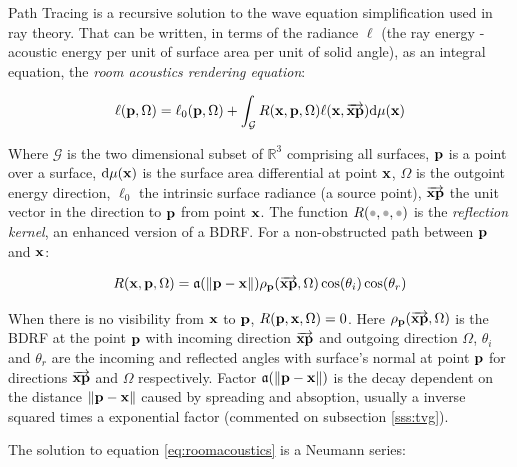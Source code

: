 Path Tracing is a recursive solution to the wave equation simplification used in
ray theory. That can be written, in terms of the radiance $\ell$ (the ray
energy - acoustic energy per unit of surface area per unit of solid angle), as an
integral equation, the \textit{room acoustics rendering
equation}\cite{siltanen2007room}:

\begin{equation}
\label{eq:roomacoustics}
\ell (\mathrm{\mathbf{p}},\Omega) = \ell_0(\mathrm{\mathbf{p}},\Omega) + \int_\mathcal{G}
R(\mathrm{\mathbf{x}},\mathrm{\mathbf{p}},\Omega) \ell
(\mathrm{\mathbf{x}},\overrightarrow{\mathrm{\mathbf{x}}\mathrm{\mathbf{p}}} ) \mathrm{d}\mu(\mathrm{\mathbf{x}})
\end{equation}

Where $\mathcal{G}$ is the two dimensional subset of $\mathbb{R}^3$ comprising
all surfaces, $\mathrm{\mathbf{p}}$ is a point over a surface, $\mathrm{d}\mu(\mathrm{\mathbf{x}})$ is the
surface area differential at point $\mathrm{\mathbf{x}}$, $\Omega$ is the outgoint
energy direction, $\ell_0$ the intrinsic surface radiance (a source point), $\overrightarrow{\mathrm{\mathbf{x}}\mathrm{\mathbf{p}}}$ the unit vector in the direction to $\mathrm{\mathbf{p}}$ from point $\mathrm{\mathbf{x}}$. The function $R(\parm,\parm,\parm)$ is the
\textit{reflection kernel}, an enhanced version of a BDRF. For a non-obstructed path between 
$\mathrm{\mathbf{p}}$ and $\mathrm{\mathbf{x}}$:

\begin{equation}
\label{eq:reflectionkernel}
R(\mathrm{\mathbf{x}},\mathrm{\mathbf{p}},\Omega) =
\mathfrak{a}(\left\lVert\mathrm{\mathbf{p}}-\mathrm{\mathbf{x}}\right\rVert)\rho_{\mathrm{\mathbf{p}}}(\overrightarrow{\mathrm{\mathbf{x}}\mathrm{\mathbf{p}}},\Omega)\cos(\theta_i)\cos(\theta_r)
\end{equation}

When there is no visibility from  $\mathrm{\mathbf{x}}$ to $\mathrm{\mathbf{p}}$,
$R(\mathrm{\mathbf{p}},\mathrm{\mathbf{x}},\Omega) = 0$. Here
$\rho_{\mathrm{\mathbf{p}}}(\overrightarrow{\mathrm{\mathbf{x}}\mathrm{\mathbf{p}}},\Omega)$ is the BDRF at the
point $\mathrm{\mathbf{p}}$ with incoming direction $\overrightarrow{\mathrm{\mathbf{x}}\mathrm{\mathbf{p}}}$
and outgoing direction $\Omega$, $\theta_i$ and $\theta_r$ are the incoming and
reflected angles with surface's normal at point $\mathrm{\mathbf{p}}$ for directions $\overrightarrow{\mathrm{\mathbf{x}}\mathrm{\mathbf{p}}}$
and $\Omega$ respectively. Factor $\mathfrak{a}(\left\lVert\mathrm{\mathbf{p}}-\mathrm{\mathbf{x}}\right\rVert)$ is
the decay dependent on the distance $\left\lVert\mathrm{\mathbf{p}}-\mathrm{\mathbf{x}}\right\rVert$ caused
by spreading and absoption, usually a inverse squared times a exponential factor (commented on subsection \ref{sss:tvg}).

The solution to equation \ref{eq:roomacoustics} is a Neumann series:



